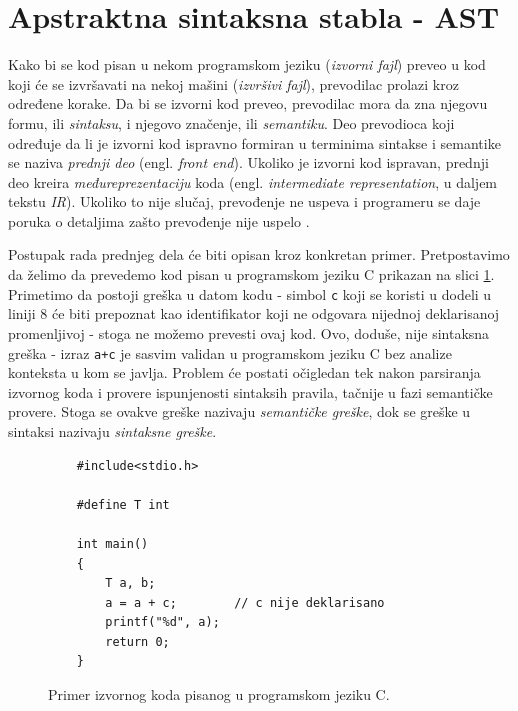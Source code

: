\section{Apstraktna sintaksna stabla - AST}
\label{sec:AST}

Kako bi se kod pisan u nekom programskom jeziku (\emph{izvorni fajl}) preveo u kod koji će se izvršavati na nekoj mašini (\emph{izvršivi fajl}), prevodilac prolazi kroz određene korake. Da bi se izvorni kod preveo, prevodilac mora da zna njegovu formu, ili \emph{sintaksu}, i njegovo značenje, ili \emph{semantiku}. Deo prevodioca koji određuje da li je izvorni kod ispravno formiran u terminima sintakse i semantike se naziva \emph{prednji deo} (engl. \emph{front end}). Ukoliko je izvorni kod ispravan, prednji deo kreira \emph{međureprezentaciju} koda (engl. \emph{intermediate representation}, u daljem tekstu \emph{IR}). Ukoliko to nije slučaj, prevođenje ne uspeva i programeru se daje poruka o detaljima zašto prevođenje nije uspelo \cite{EngineeringCompilers}.

Postupak rada prednjeg dela će biti opisan kroz konkretan primer. Pretpostavimo da želimo da prevedemo kod pisan u programskom jeziku C prikazan na slici \ref{fig:CompilationProcessInit}. Primetimo da postoji greška u datom kodu - simbol \texttt{c} koji se koristi u dodeli u liniji $8$ će biti prepoznat kao identifikator koji ne odgovara nijednoj deklarisanoj promenljivoj - stoga ne možemo prevesti ovaj kod. Ovo, doduše, nije sintaksna greška - izraz \texttt{a+c} je sasvim validan u programskom jeziku C bez analize konteksta u kom se javlja. Problem će postati očigledan tek nakon parsiranja izvornog koda i provere ispunjenosti sintaksih pravila, tačnije u fazi semantičke provere. Stoga se ovakve greške nazivaju \emph{semantičke greške}, dok se greške u sintaksi nazivaju \emph{sintaksne greške}.

\begin{figure}[h!]
    \begin{lstlisting}
    #include<stdio.h>

    #define T int

    int main()
    {
        T a, b;
        a = a + c;        // c nije deklarisano
        printf("%d", a);
        return 0;
    }
    \end{lstlisting}
    \caption{Primer izvornog koda pisanog u programskom jeziku C.}
    \label{fig:CompilationProcessInit}
\end{figure}

